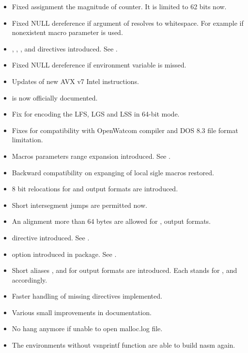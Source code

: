 \begin{itemize}
    \item{Fixed assignment the magnitude of  counter.
        It is limited to 62 bits now.}
    \item{Fixed NULL dereference if argument of  resolves
        to whitespace. For example if nonexistent macro parameter is used.}
    \item{, , , and
         directives introduced. See .}
    \item{Fixed NULL dereference if environment variable is missed.}
    \item{Updates of new AVX v7 Intel instructions.}
    \item{ is now officially documented.}
    \item{Fix for encoding the LFS, LGS and LSS in 64-bit mode.}
    \item{Fixes for compatibility with OpenWatcom compiler and DOS 8.3 file format limitation.}
    \item{Macros parameters range expansion introduced. See .}
    \item{Backward compatibility on expanging of local sigle macros restored.}
    \item{8 bit relocations for  and  output formats are introduced.}
    \item{Short intersegment jumps are permitted now.}
    \item{An alignment more than 64 bytes are allowed for ,
         output formats.}
    \item{ directive introduced. See .}
    \item{ option introduced in  package. See
        .}
    \item{Short aliases ,  and  for output formats are
        introduced. Each stands for ,  and 
        accordingly.}
    \item{Faster handling of missing directives implemented.}
    \item{Various small improvements in documentation.}
    \item{No hang anymore if unable to open malloc.log file.}
    \item{The environments without vsnprintf function are able to build nasm again.}

\end{itemize}
